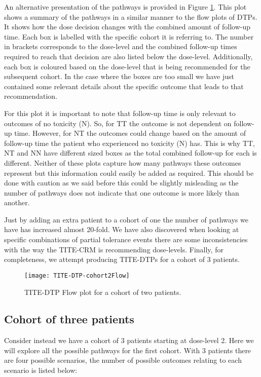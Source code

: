 An alternative presentation of the pathways is provided in Figure \ref{fig_tite-dtp:TITEDTP-cohort2-flow}. This plot shows a summary of the pathways in a similar manner to the flow plots of DTPs. It shows how the dose decision changes with the combined amount of follow-up time. Each box is labelled with the specific cohort it is referring to. The number in brackets corresponds to the dose-level and the combined follow-up times required to reach that decision are also listed below the dose-level. Additionally, each box is coloured based on the dose-level that is being recommended for the subsequent cohort. In the case where the boxes are too small we have just contained some relevant details about the specific outcome that leads to that recommendation. 

For this plot it is important to note that follow-up time is only relevant to outcomes of no toxicity (N). So, for TT the outcome is not dependent on follow-up time. However, for NT the outcomes could change based on the amount of follow-up time the patient who experienced no toxicity (N) has. This is why TT, NT and NN have different sized boxes as the total combined follow-up for each is different. Neither of these plots capture how many pathways these outcomes represent but this information could easily be added as required. This should be done with caution as we said before this could be slightly misleading as the number of pathways does not indicate that one outcome is more likely than another. 

Just by adding an extra patient to a cohort of one the number of pathways we have has increased almost 20-fold. We have also discovered when looking at specific combinations of partial tolerance events there are some inconsistencies with the way the TITE-CRM is recommending dose-levels. Finally, for completeness, we attempt producing TITE-DTPs for a cohort of 3 patients.   


\begin{figure}[H]
	\centering
	\caption{TITE-DTP Flow plot for a cohort of two patients.}
	\label{fig_tite-dtp:TITEDTP-cohort2-flow}
	\texttt{[image: TITE-DTP-cohort2Flow]}
\end{figure}




\subsection{Cohort of three patients}
\label{tite-dtp:TITE-DTPsC3}
Consider instead we have a cohort of 3 patients starting at dose-level 2. Here we will explore all the possible pathways for the first cohort. With 3 patients there are four possible scenarios, the number of possible outcomes relating to each scenario is listed below: 

